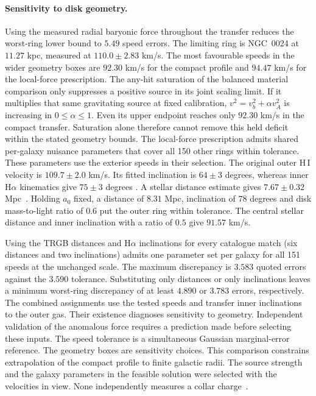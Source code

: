 \documentclass[11pt]{article}
\begin{document}
\paragraph{Sensitivity to disk geometry.}
Using the measured radial baryonic force throughout the transfer
reduces the worst-ring lower bound to $5.49$ speed errors. The limiting
ring is NGC~0024 at $11.27$ kpc, measured at $110.0\pm2.83$ km/s.
The most favourable speeds in the wider geometry boxes are $92.30$ km/s
for the compact profile and $94.47$ km/s for the local-force prescription.
The any-hit saturation of the balanced material comparison only suppresses a positive
source in its joint scaling limit. If it multiplies that same
gravitating source at fixed calibration, $v^2=v_b^2+\alpha v_A^2$
is increasing in $0\le\alpha\le1$. Even its upper endpoint reaches
only $92.30$ km/s in the compact transfer. Saturation alone therefore
cannot remove this held deficit within the stated geometry bounds.
The local-force prescription admits shared per-galaxy nuisance parameters that cover all
150 other rings within tolerance. These parameters use the exterior
speeds in their selection. The original outer H\,I velocity is
$109.7\pm2.0$ km/s. Its fitted inclination is $64\pm3$ degrees, whereas
inner H$\alpha$ kinematics give $75\pm3$ degrees
\cite{chemin24,dicaire24}. A stellar distance estimate gives
$7.67\pm0.32$ Mpc~\cite{schombert20}. Holding $a_0$ fixed, a distance
of $8.31$ Mpc, inclination of $78$ degrees and disk mass-to-light ratio
of $0.6$ put the outer ring within tolerance. The central stellar
distance and inner inclination with a ratio of $0.5$ give $91.57$ km/s.

Using the TRGB distances and H$\alpha$ inclinations for every
catalogue match (six distances and two inclinations) admits one
parameter set per galaxy for all 151 speeds at the unchanged scale.
The maximum discrepancy is $3.583$ quoted errors against the $3.590$
tolerance. Substituting only distances or only inclinations leaves a
minimum worst-ring discrepancy of at least $4.890$ or $3.783$ errors,
respectively. The combined assignments use the tested speeds and transfer
inner inclinations to the outer gas. Their existence diagnoses sensitivity
to geometry. Independent validation of the anomalous force requires a
prediction made before selecting these inputs. The speed tolerance is a simultaneous Gaussian
marginal-error reference. The geometry boxes are sensitivity choices.
This comparison constrains extrapolation of the compact profile to finite
galactic radii. The source strength and the galaxy parameters in the feasible
solution were selected with the velocities in view. None independently
measures a collar charge~\cite{ophrar,sparc2016}.
\end{document}
